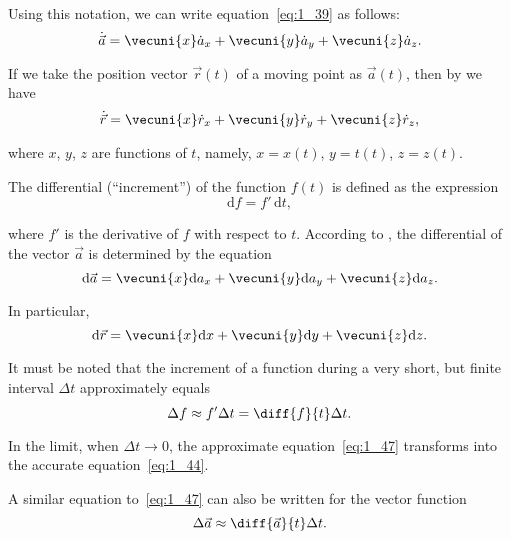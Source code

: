 \noindent
Using this notation, we can write equation~\eqref{eq:1_39} as follows:
\begin{equation}\label{eq:1_42}
\dot{\vec{a}} = \vecuni{x}\dot{a}_x + \vecuni{y}\dot{a}_y + \vecuni{z}\dot{a}_z.
\end{equation}

\noindent
If we take the position vector $\vec{r}(t)$ of a moving point as $\vec{a}(t)$, then by  we have
\begin{equation}\label{eq:1_43}
\dot{\vec{r}} = \vecuni{x}\dot{r}_x + \vecuni{y}\dot{r}_y + \vecuni{z}\dot{r}_z,
\end{equation}

\noindent
where $x$, $y$, $z$ are functions of $t$, namely, $x=x(t)$, $y=t(t)$, $z=z(t)$.

The differential (``increment'') of the function $f(t)$ is defined as the expression
\begin{equation}\label{eq:1_44}
\mathrm{d}f = f'\, \mathrm{d}t,
\end{equation}

\noindent
where $f'$ is the derivative of $f$ with respect to $t$.  According to , the differential of the vector $\vec{a}$ is determined by the equation
\begin{equation}\label{eq:1_45}
\mathrm{d}\vec{a} = \vecuni{x}\mathrm{d}a_x + \vecuni{y}\mathrm{d}a_y + \vecuni{z}\mathrm{d}a_z.
\end{equation}

In particular,
\begin{equation}\label{eq:1_46}
\mathrm{d}\vec{r} = \vecuni{x}\mathrm{d}x + \vecuni{y}\mathrm{d}y + \vecuni{z}\mathrm{d}z.
\end{equation}

It must be noted that the increment of a function during a very short, but finite interval $\Delta t$ approximately equals
\begin{equation}\label{eq:1_47}
\Delta f \approx f'\Delta t = \diff{f}{t}\Delta t.
\end{equation}

\noindent
In the limit, when $\Delta t\to 0$, the approximate equation~\eqref{eq:1_47} transforms into the accurate equation~\eqref{eq:1_44}.

A similar equation to~\eqref{eq:1_47} can also be written for the vector function
\begin{equation}\label{eq:1_48}
\Delta\vec{a} \approx \diff{\vec{a}}{t}\Delta t.
\end{equation}


